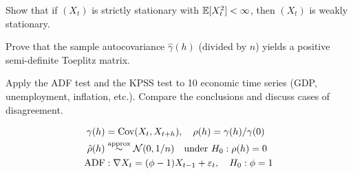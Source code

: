\begin{exercise}[$\star\star$]
Show that if $(X_t)$ is strictly stationary with $\mathbb{E}[X_t^2]<\infty$, then $(X_t)$ is weakly stationary.
\end{exercise}

\begin{exercise}[$\star\star$]
Prove that the sample autocovariance $\hat{\gamma}(h)$ (divided by $n$) yields a positive semi-definite Toeplitz matrix.
\end{exercise}

\begin{exercise}
Apply the ADF test and the KPSS test to 10 economic time series (GDP, unemployment, inflation, etc.). Compare the conclusions and discuss cases of disagreement.
\end{exercise}

\begin{keyformulas}
\begin{align*}
\gamma(h) &= \operatorname{Cov}(X_t,X_{t+h}), \quad \rho(h)=\gamma(h)/\gamma(0) \\
\hat{\rho}(h) &\stackrel{\text{approx}}{\sim} \mathcal{N}(0,1/n) \quad\text{under }H_0:\rho(h)=0 \\
\text{ADF} &: \nabla X_t = (\phi-1)X_{t-1}+\varepsilon_t, \quad H_0:\phi=1
\end{align*}
\end{keyformulas}
